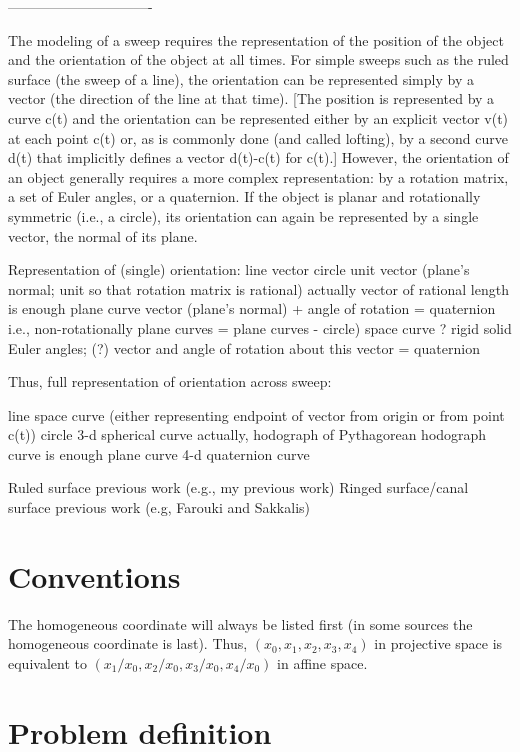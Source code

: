{-------------------------------

The modeling of a sweep requires the representation of the position
of the object and the orientation of the object at all times.
For simple sweeps such as the ruled surface (the sweep of a line),
the orientation can be represented simply by a vector
(the direction of the line at that time).
[The position is represented by a curve c(t) and the orientation can be
represented either by an explicit vector v(t) at each point c(t)
or, as is commonly done (and called lofting), by a second curve d(t) that 
implicitly defines a vector d(t)-c(t) for c(t).]
However, the orientation of an object generally requires a more complex
representation: by a rotation matrix, a set of Euler angles, or a quaternion.
If the object is planar and rotationally symmetric (i.e., a circle),
its orientation can again be represented by a single vector, the normal
of its plane.

Representation of (single) orientation:
	line		vector
	circle		unit vector (plane's normal; 
				     unit so that rotation matrix is rational)
			actually vector of rational length is enough
	plane curve	vector (plane's normal) + angle of rotation = quaternion
				     i.e., non-rotationally plane curves = plane curves - circle)
	space curve	?
	rigid solid	Euler angles; (?) vector and angle of rotation about this vector = quaternion

Thus, full representation of orientation across sweep:

	line		space curve (either representing endpoint of vector from
				origin or from point c(t))
	circle		3-d spherical curve
			actually, hodograph of Pythagorean hodograph curve is enough
	plane curve	4-d quaternion curve


Ruled surface previous work (e.g., my previous work)
Ringed surface/canal surface previous work (e.g, Farouki and Sakkalis)
}


\section{Conventions}

The homogeneous coordinate will always be listed first
(in some sources the homogeneous coordinate is last).
Thus, $(x_0,x_1,x_2,x_3,x_4)$ in projective space is equivalent to
$(x_1/x_0,x_2/x_0,x_3/x_0,x_4/x_0)$ in affine space.

\section{Problem definition}


